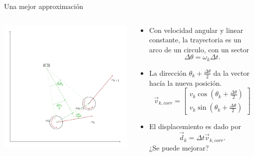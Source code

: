 \documentclass[presentation,aspectratio=169]{beamer}
\begin{document}
\begin{frame}[label={sec:org6b48eb3}]{Una mejor approximación}
\begin{columns}
\begin{column}{0.6\columnwidth}
\begin{center}
  \includegraphics[width=\linewidth]{../figures/odometry-improvement}
\end{center}
\end{column}

\begin{column}{0.4\columnwidth}
\begin{itemize}
\item Con velocidad angular y linear constante, la trayectoria es un arco de un circulo, con un sector \[\Delta \theta = \omega_k \Delta t.\]
\item La dirección \(\theta_k + \frac{\Delta \theta}{2}\) da la vector hacía la nueva posición.
\[\vec{v}_{k, corr} = \begin{bmatrix} v_k \cos(\theta_k + \frac{\Delta \theta}{2})\\v_k\sin(\theta_k + \frac{\Delta \theta}{2})\end{bmatrix}\]
\end{itemize}

\pause
\begin{itemize}
\item El displacemiento es dado por \[\vec{d}_k = \Delta t \vec{v}_{k, corr}.\] \alert{¿Se puede mejorar?}
\end{itemize}
\end{column}
\end{columns}
\end{frame}
\end{document}
